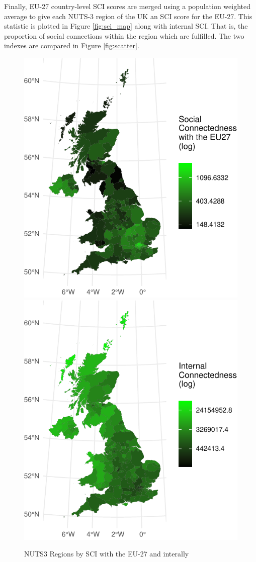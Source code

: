 \documentclass{article}
\begin{document}
Finally, EU-27 country-level SCI scores are merged using a population
weighted average to give each NUTS-3 region of the UK an SCI score for
the EU-27. This statistic is plotted in Figure \ref{fig:sci_map} along
with internal SCI. That is, the proportion of social connections within
the region which are fulfilled. The two indexes are compared in Figure
\ref{fig:scatter}.

\begin{figure}

{\centering \includegraphics[width=0.49\linewidth]{SCI-and-Leave-Voting_files/figure-latex/eu members-1} \includegraphics[width=0.49\linewidth]{SCI-and-Leave-Voting_files/figure-latex/eu members-2} 

}

\caption{\label{fig:sci_map}NUTS3 Regions by SCI with the EU-27 and interally}\label{fig:eu members}
\end{figure}
\end{document}
